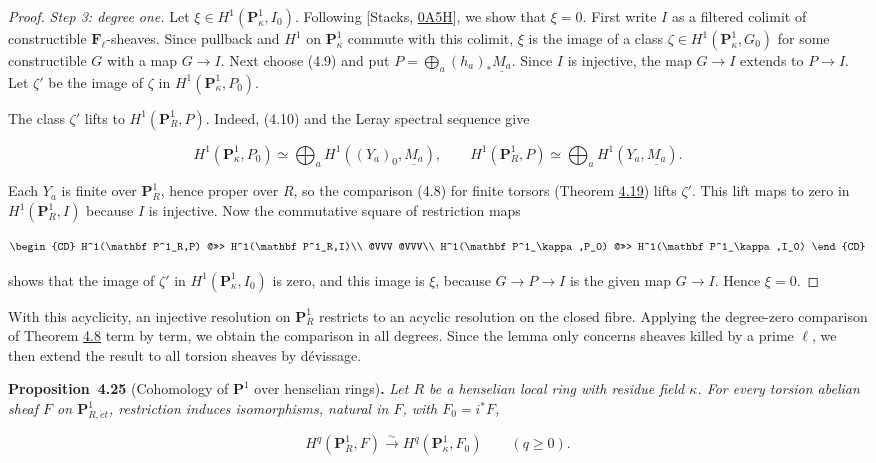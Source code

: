 \documentclass[11pt]{article}
\newenvironment{bpstatement}[2]{\par\addvspace{0.6\baselineskip}\noindent\textbf{#1}#2\textbf{.}\enspace\ignorespaces}
  {\par\addvspace{0.4\baselineskip}}
\newenvironment{bpstatementit}[2]{\begin{bpstatement}{#1}{#2}\itshape\ignorespaces}{\end{bpstatement}}
\begin{document}
\begin{proof}[{Proof}]
\emph{Step 3: degree one.} Let \(\xi\in H^1(\mathbf P^1_\kappa,I_0)\). Following [Stacks, \href{https://stacks.math.columbia.edu/tag/0A5H}{0A5H}], we show that \(\xi=0\). First write \(I\) as a filtered colimit of constructible \(\mathbf F_\ell\)-sheaves. Since pullback and \(H^1\) on \(\mathbf P^1_\kappa\) commute with this colimit, \(\xi\) is the image of a class \(\zeta\in H^1(\mathbf P^1_\kappa,G_0)\) for some constructible \(G\) with a map \(G\to I\). Next choose (4.9) and put \(P=\bigoplus_a(h_a)_*\underline{M_a}\). Since \(I\) is injective, the map \(G\to I\) extends to \(P\to I\). Let \(\zeta'\) be the image of \(\zeta\) in \(H^1(\mathbf P^1_\kappa,P_0)\).

The class \(\zeta'\) lifts to \(H^1(\mathbf P^1_R,P)\). Indeed, (4.10) and the Leray spectral sequence give

\[
H^1(\mathbf P^1_\kappa,P_0)
\simeq\bigoplus_a H^1((Y_a)_0,\underline{M_a}),\qquad
H^1(\mathbf P^1_R,P)\simeq\bigoplus_a H^1(Y_a,\underline{M_a}).
\]

Each \(Y_a\) is finite over \(\mathbf P^1_R\), hence proper over \(R\), so the comparison (4.8) for finite torsors (Theorem \hyperref[bp337]{4.19}) lifts \(\zeta'\). This lift maps to zero in \(H^1(\mathbf P^1_R,I)\) because \(I\) is injective. Now the commutative square of restriction maps

\[
\begin{CD}
H^1(\mathbf P^1_R,P) @>>> H^1(\mathbf P^1_R,I)\\
@VVV @VVV\\
H^1(\mathbf P^1_\kappa,P_0) @>>> H^1(\mathbf P^1_\kappa,I_0)
\end{CD}
\]

shows that the image of \(\zeta'\) in \(H^1(\mathbf P^1_\kappa,I_0)\) is zero, and this image is \(\xi\), because \(G\to P\to I\) is the given map \(G\to I\). Hence \(\xi=0\).
\end{proof}

\label{bp354}%
With this acyclicity, an injective resolution on \(\mathbf P^1_R\) restricts to an acyclic resolution on the closed fibre. Applying the degree-zero comparison of Theorem \hyperref[bp308]{4.8} term by term, we obtain the comparison in all degrees. Since the lemma only concerns sheaves killed by a prime \(\ell\), we then extend the result to all torsion sheaves by dévissage.

\label{bp355}%
\begin{bpstatementit}{Proposition~4.25}{ (Cohomology of $\mathbf P^1$ over henselian rings)}
Let \(R\) be a henselian local ring with residue field \(\kappa\). For every torsion abelian sheaf \(F\) on \(\mathbf P^1_{R,\acute{e}t}\), restriction induces isomorphisms, natural in \(F\), with \(F_0=i^*F\),

\[
H^q(\mathbf P^1_R,F)\xrightarrow{\sim}
H^q(\mathbf P^1_\kappa,F_0)\qquad(q\geq0).
\]
\end{bpstatementit}
\end{document}
